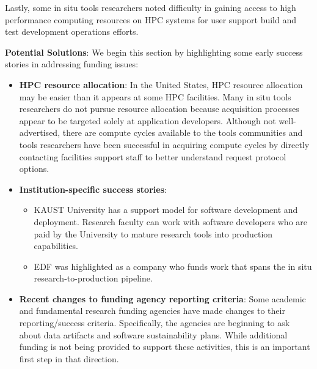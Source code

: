 \begin{refsection}
Lastly, some in situ tools researchers noted difficulty in gaining access to high performance computing resources on HPC systems for user support build and test development operations efforts.

\textbf{Potential Solutions}: We begin this section by highlighting some early success stories in addressing  funding issues:
 \begin{itemize}
\item \textbf{HPC resource allocation}:  In the United States,  HPC resource allocation may be easier than it appears at some HPC facilities. Many in situ tools researchers do not pursue resource allocation because acquisition processes appear to be targeted solely at application developers.  Although not well-advertised, there are compute cycles available to the tools communities and tools researchers have been successful in acquiring compute cycles by directly contacting facilities support staff to better understand request protocol options.
\item  \textbf{Institution-specific success stories}:
\begin{itemize}
\item KAUST University has a support model for software development and deployment.   Research faculty can work with software developers who are paid by the University to mature research tools into production capabilities.  
\item EDF was highlighted as a company who funds work that spans the in situ research-to-production pipeline.  
\end{itemize}
\item \textbf{Recent changes to funding agency reporting criteria}: Some academic and fundamental research funding agencies have made changes to their reporting/success criteria. Specifically, the agencies are beginning to ask about data artifacts and software sustainability plans.  While additional funding is not being provided to support these activities, this is an important first step in that direction.
\end{itemize}


\end{refsection}
